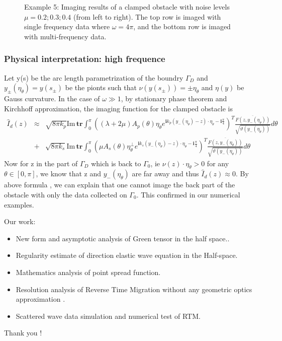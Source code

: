 \documentclass[cjk,8pt]{beamer}
\renewcommand{\i}{\mathbf{i}}
\renewcommand{\Im}{\mathrm{Im}\,}
\newcommand{\om}{\omega}
\newcommand{\Ga}{\Gamma}
\renewcommand{\i}{\mathbf{i}}
\renewcommand{\Im}{\mathrm{Im}\,}
\newcommand{\ben}{\begin{eqnarray*}}
\newcommand{\een}{\end{eqnarray*}}
\begin{document}
\begin{CJK*}{GBK}{kai}
\begin{frame}
\begin{figure}[h]
	\caption{Example 5: Imaging results of a clamped obstacle with noise levels $\mu =  0.2; 0.3; 0.4$ (from left to
		right). The top row is imaged with single frequency data where $\om=4\pi$, and the
		bottom row is imaged with multi-frequency data.}
\end{figure}
\end{frame}

\begin{frame}
\frametitle{Physical interpretation: high frequence}
Let y(s) be the arc length parametrization of the boundry $\Ga_D$ and $y_{\pm}(\eta_\theta)=y(s_{\pm})$ be the pionts such that $\nu(y(s_{\pm}))=\pm\eta_\theta$ and $\eta(y)$ be Gauss curvature. In the case of $\omega\gg1$, by stationary phase theorem and Kirchhoff approximation, the imaging function for the clamped obstacle is
\ben
\hat{I}_d(z)&\approx&\sqrt{8\pi k_p}\Im\mathbf{tr} \int_{0}^{\pi}((\lambda+2\mu)A_p(\theta)\eta_\theta e^{\i k_p (y_-(\eta_\theta)-z)\cdot \eta_\theta-\i\frac{\pi}{4}})^T\frac{\overline{F(z,y_-(\eta_\theta))}}{\sqrt{\vartheta(y_-(\eta_\theta))}}d\theta \\
&+&\sqrt{8\pi k_s}\Im\mathbf{tr} \int_{0}^{\pi}(\mu A_s(\theta)\eta_\theta^\perp e^{\i k_s (y_-(\eta_\theta)-z)\cdot \eta_\theta-\i\frac{\pi}{4}})^T\frac{\overline{F(z,y_-(\eta_\theta))}}{\sqrt{\vartheta(y_-(\eta_\theta))}}d\theta
\een
Now for z in the part of $\Ga_D$ which is back to $\Ga_0$, ie $\nu(z)\cdot\eta_\theta>0$ for any $\theta\in[0,\pi]$, we know that z and $y_{-}(\eta_\theta)$ are far away and thus $\hat{I}_d(z)\approx0$. By above formula , we can explain that one cannot image the back part of the obstacle with only the data collected on $\Ga_0$. This confirmed in our numerical examples.
\end{frame}


\begin{frame}
Our work:
\begin{itemize}
\item New form and asymptotic analysis of Green tensor in the half space..
\item Regularity estimate of direction elastic wave equation in the Half-space.
\item Mathematics analysis of point spread function.
\item Resolution analysis of Reverse Time Migration without any geometric optics approximation .
\item Scattered wave data simulation and numerical test of RTM.
\end{itemize}
\vspace{1cm}
\begin{flushright}
  \LARGE \textcolor[rgb]{1.00,0.00,0.00}{Thank you !}
\end{flushright}
\end{frame}

\end{CJK*}

%
\end{document}
